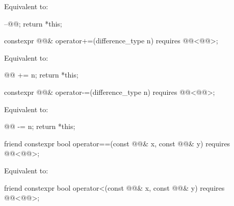\begin{itemdescr}
\pnum
\effects
Equivalent to:
\begin{codeblock}
--@@;
return *this;
\end{codeblock}
\end{itemdescr}

%
\begin{itemdecl}
constexpr @@& operator+=(difference_type n)
  requires @@<@@>;
\end{itemdecl}

\begin{itemdescr}
\pnum
\effects
Equivalent to:
\begin{codeblock}
@@ += n;
return *this;
\end{codeblock}
\end{itemdescr}

%
\begin{itemdecl}
constexpr @@& operator-=(difference_type n)
  requires @@<@@>;
\end{itemdecl}

\begin{itemdescr}
\pnum
\effects
Equivalent to:
\begin{codeblock}
@@ -= n;
return *this;
\end{codeblock}
\end{itemdescr}

%
\begin{itemdecl}
friend constexpr bool operator==(const @@& x, const @@& y)
  requires @@<@@>;
\end{itemdecl}

\begin{itemdescr}
\pnum
\effects
Equivalent to: 
\end{itemdescr}

%
\begin{itemdecl}
friend constexpr bool operator<(const @@& x, const @@& y)
  requires @@<@@>;
\end{itemdecl}

